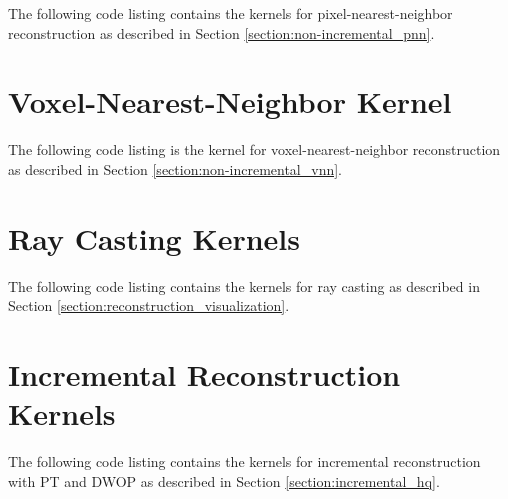 \documentclass[12pt, twoside, a4paper]{book}
\begin{document}
		The following code listing contains the kernels for pixel-nearest-neighbor reconstruction as described in Section \ref{section:non-incremental_pnn}.
	
		
	
	\section{Voxel-Nearest-Neighbor Kernel}
		\label{section:vnn_kernel}
	
		The following code listing is the kernel for voxel-nearest-neighbor reconstruction as described in Section \ref{section:non-incremental_vnn}.
	
		
		
	\section{Ray Casting Kernels}
		\label{section:ray_casting_kernel}
	
		The following code listing contains the kernels for ray casting as described in Section \ref{section:reconstruction_visualization}.
	
		
		
	\section{Incremental Reconstruction Kernels}
		\label{section:incremental_kernel}
	
		The following code listing contains the kernels for incremental reconstruction with PT and DWOP as described in Section \ref{section:incremental_hq}.
	
		

%
\end{document}
